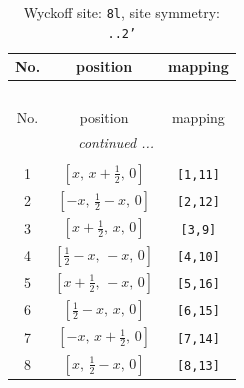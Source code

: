 \documentclass[fleqn,8pt]{jsarticle}
\begin{document}
\begin{longtable}{ccc}
\caption{Wyckoff site: {\tt 8l}, site symmetry: {\tt ..2'}}
 \\
 \hline \hline
No. & position & mapping \\ \hline \endfirsthead

\multicolumn{2}{l}{\tablename\ \thetable{}} \\
 \hline \hline
No. & position & mapping \\ \hline \endhead

 \hline \hline
\multicolumn{2}{r}{\footnotesize\it continued ...} \\ \endfoot

 \hline \hline
\multicolumn{2}{r}{} \\ \endlastfoot

1 & $\left[ x,\, x + \frac{1}{2},\, 0 \right]$ & {\tt [1,11]} \\ \hline
2 & $\left[ - x,\, \frac{1}{2} - x,\, 0 \right]$ & {\tt [2,12]} \\ \hline
3 & $\left[ x + \frac{1}{2},\, x,\, 0 \right]$ & {\tt [3,9]} \\ \hline
4 & $\left[ \frac{1}{2} - x,\, - x,\, 0 \right]$ & {\tt [4,10]} \\ \hline
5 & $\left[ x + \frac{1}{2},\, - x,\, 0 \right]$ & {\tt [5,16]} \\ \hline
6 & $\left[ \frac{1}{2} - x,\, x,\, 0 \right]$ & {\tt [6,15]} \\ \hline
7 & $\left[ - x,\, x + \frac{1}{2},\, 0 \right]$ & {\tt [7,14]} \\ \hline
8 & $\left[ x,\, \frac{1}{2} - x,\, 0 \right]$ & {\tt [8,13]} \\
\end{longtable}
\renewcommand{\arraystretch}{1.2}
\end{document}
